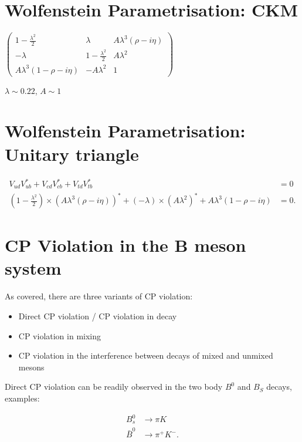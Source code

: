 \documentclass[]{article}
\begin{document}
\newpage
\section{Wolfenstein Parametrisation: CKM}

		$\begin{pmatrix}
			1 - \frac{\lambda^2}{2} & \lambda & A\lambda^3(\rho - i\eta) \\
			-\lambda & 1 - \frac{\lambda^2}{2} & A\lambda^2 \\
			A\lambda^3(1 - \rho - i\eta) & -A\lambda^2 & 1 
		\end{pmatrix}$
		
		$\lambda \sim 0.22$, $A \sim 1$
		
\section{Wolfenstein Parametrisation: Unitary triangle}
	
	\begin{align*}
	V_{ud}V^*_{ub} + V_{cd}V^*_{cb} + V_{td}V^*_{tb} &= 0 \\
	(1 - \frac{\lambda^2}{2}) \times (A\lambda^3(\rho - i\eta))^* + (-\lambda)\times(A\lambda^2)^* + A\lambda^3(1 - \rho - i\eta) &= 0.	
	\end{align*}
	
	\newpage
	
\section{CP Violation in the B meson system}

	As covered, there are three variants of CP violation: 
	
	\begin{itemize}
		\item Direct CP violation / CP violation in decay
		\item CP violation in mixing
		\item CP violation in the interference between decays of mixed and unmixed mesons
	\end{itemize}
	
	Direct CP violation can be readily observed in the two body $B^0$ and $B_S$ decays, examples:
	
	\begin{align*}
	B^0_s &\rightarrow \pi K \\
	\bar{B}^0 &\rightarrow \pi^+K^-.
	\end{align*}
	
\end{document}
